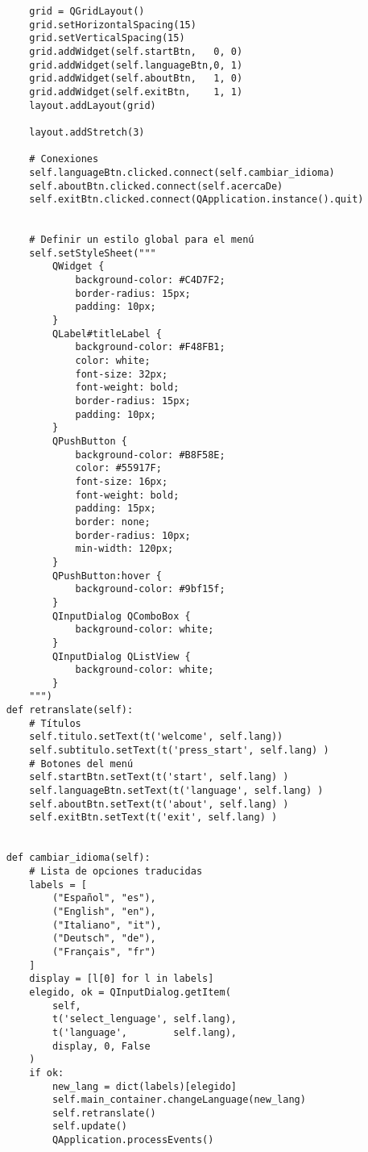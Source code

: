 \begin{lstlisting}
        grid = QGridLayout()
        grid.setHorizontalSpacing(15)
        grid.setVerticalSpacing(15)
        grid.addWidget(self.startBtn,   0, 0)
        grid.addWidget(self.languageBtn,0, 1)
        grid.addWidget(self.aboutBtn,   1, 0)
        grid.addWidget(self.exitBtn,    1, 1)
        layout.addLayout(grid)

        layout.addStretch(3)
        
        # Conexiones
        self.languageBtn.clicked.connect(self.cambiar_idioma)
        self.aboutBtn.clicked.connect(self.acercaDe)
        self.exitBtn.clicked.connect(QApplication.instance().quit)

        
        # Definir un estilo global para el menú
        self.setStyleSheet("""
            QWidget {
                background-color: #C4D7F2;  
                border-radius: 15px;
                padding: 10px;
            }
            QLabel#titleLabel {
                background-color: #F48FB1;  
                color: white;
                font-size: 32px;
                font-weight: bold;
                border-radius: 15px;
                padding: 10px;
            }
            QPushButton {
                background-color: #B8F58E;
                color: #55917F;
                font-size: 16px;
                font-weight: bold;
                padding: 15px;
                border: none;
                border-radius: 10px;
                min-width: 120px;
            }
            QPushButton:hover {
                background-color: #9bf15f;
            }
            QInputDialog QComboBox {
                background-color: white;
            }
            QInputDialog QListView {
                background-color: white;
            }
        """)
    def retranslate(self):
        # Títulos
        self.titulo.setText(t('welcome', self.lang))
        self.subtitulo.setText(t('press_start', self.lang) )
        # Botones del menú
        self.startBtn.setText(t('start', self.lang) )
        self.languageBtn.setText(t('language', self.lang) )
        self.aboutBtn.setText(t('about', self.lang) )
        self.exitBtn.setText(t('exit', self.lang) )

        
    def cambiar_idioma(self):
        # Lista de opciones traducidas
        labels = [
            ("Español", "es"),
            ("English", "en"),
            ("Italiano", "it"),
            ("Deutsch", "de"),
            ("Français", "fr")
        ]
        display = [l[0] for l in labels]
        elegido, ok = QInputDialog.getItem(
            self,
            t('select_lenguage', self.lang),
            t('language',        self.lang),
            display, 0, False
        )
        if ok:
            new_lang = dict(labels)[elegido]
            self.main_container.changeLanguage(new_lang)
            self.retranslate()
            self.update()    
            QApplication.processEvents()


\end{lstlisting}
